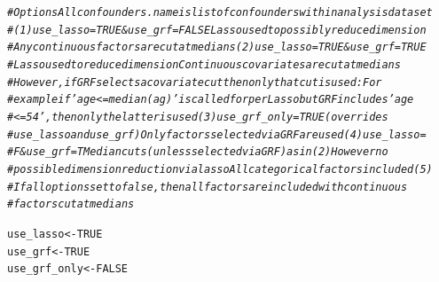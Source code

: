 \documentclass[smallextended]{svjour3}
\makeatletter
\newcommand{\hlnum}[1]{\textcolor[rgb]{0.686,0.059,0.569}{#1}}%
\newcommand{\hlcom}[1]{\textcolor[rgb]{0.678,0.584,0.686}{\textit{#1}}}%
\newcommand{\hlstd}[1]{\textcolor[rgb]{0.345,0.345,0.345}{#1}}%
\newcommand{\hlkwb}[1]{\textcolor[rgb]{0.69,0.353,0.396}{#1}}%
\newenvironment{kframe}{%
 \def\at@end@of@kframe{}%
 \ifinner\ifhmode%
  \def\at@end@of@kframe{\end{minipage}}%
  \begin{minipage}{\columnwidth}%
 \fi\fi%
 \def\FrameCommand##1{\hskip\@totalleftmargin \hskip-\fboxsep
 \colorbox{shadecolor}{##1}\hskip-\fboxsep
     \hskip-\linewidth \hskip-\@totalleftmargin \hskip\columnwidth}%
 \MakeFramed {\advance\hsize-\width
   \@totalleftmargin\z@ \linewidth\hsize
   \@setminipage}}%
 {\par\unskip\endMakeFramed%
 \at@end@of@kframe}
\newenvironment{knitrout}{}{} %
\makeatother
\begin{document}
\begin{knitrout}
\begin{kframe}
{\ttfamily\noindent\bfseries\color{errorcolor}{\#\# Error in eval(predvars, data, env): object 'noise1' not found}}\begin{alltt}
\hlcom{# Options Allconfounders.name is list of confounders within analysis dataset}
\hlcom{# (1) use_lasso=TRUE & use_grf=FALSE Lasso used to possibly reduce dimension}
\hlcom{# Any continuous factors are cut at medians (2) use_lasso=TRUE & use_grf=TRUE}
\hlcom{# Lasso used to reduce dimension Continuous covariates are cut at medians}
\hlcom{# However, if GRF selects a covariate cut then only that cut is used: For}
\hlcom{# example if 'age <= median(ag)' is called for per Lasso but GRF includes 'age}
\hlcom{# <= 54', then only the latter is used (3) use_grf_only = TRUE (overrides}
\hlcom{# use_lasso and use_grf) Only factors selected via GRF are used (4) use_lasso =}
\hlcom{# F & use_grf =T Median cuts (unless selected via GRF) as in (2) However no}
\hlcom{# possible dimension reduction via lasso All categorical factors included (5)}
\hlcom{# If all options set to false, then all factors are included with continuous}
\hlcom{# factors cut at medians}

\hlstd{use_lasso} \hlkwb{<-} \hlnum{TRUE}
\hlstd{use_grf} \hlkwb{<-} \hlnum{TRUE}
\hlstd{use_grf_only} \hlkwb{<-} \hlnum{FALSE}


\end{alltt}
\end{kframe}
\end{knitrout}
\end{document}
